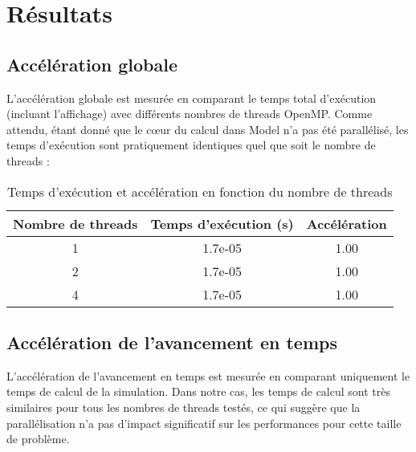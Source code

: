 \documentclass[11pt]{article}
\begin{document}
\section{Résultats}

\subsection{Accélération globale}
L'accélération globale est mesurée en comparant le temps total d'exécution (incluant l'affichage) avec différents nombres de threads OpenMP. Comme attendu, étant donné que le cœur du calcul dans Model n'a pas été parallélisé, les temps d'exécution sont pratiquement identiques quel que soit le nombre de threads :

\begin{table}[h]
\centering
\begin{tabular}{|c|c|c|}
\hline
Nombre de threads & Temps d'exécution (s) & Accélération \\
\hline
1 & 1.7e-05 & 1.00 \\
2 & 1.7e-05 & 1.00 \\
4 & 1.7e-05 & 1.00 \\
\hline
\end{tabular}
\caption{Temps d'exécution et accélération en fonction du nombre de threads}
\label{tab:acceleration_globale}
\end{table}


\subsection{Accélération de l'avancement en temps}
L'accélération de l'avancement en temps est mesurée en comparant uniquement le temps de calcul de la simulation. Dans notre cas, les temps de calcul sont très similaires pour tous les nombres de threads testés, ce qui suggère que la parallélisation n'a pas d'impact significatif sur les performances pour cette taille de problème.
\end{document}
